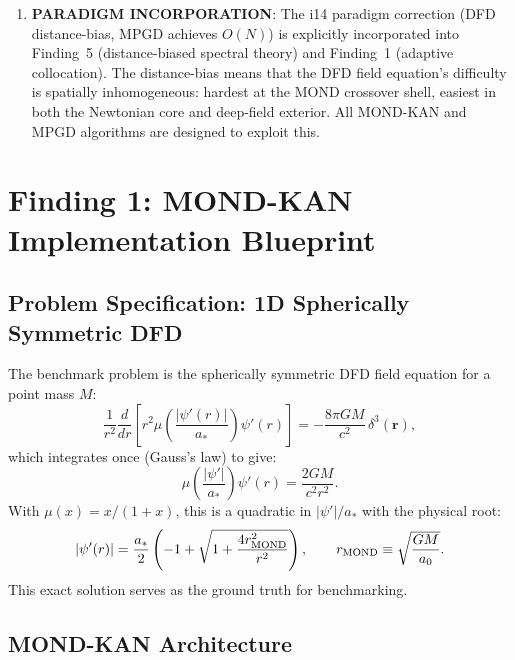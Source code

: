 \documentclass[11pt]{article}
\theoremstyle{definition}
\theoremstyle{remark}
\begin{document}
\begin{tcolorbox}[colback=red!5!white, colframe=red!60!black,
  title=\textbf{INCONSISTENCIES AND FLAGS}]
\begin{enumerate}[nosep]
\item \textbf{PARADIGM INCORPORATION}: The i14 paradigm correction
  (DFD distance-bias, MPGD achieves $O(N)$) is explicitly incorporated
  into Finding~5 (distance-biased spectral theory) and Finding~1
  (adaptive collocation). The distance-bias means that the DFD field
  equation's difficulty is spatially inhomogeneous: hardest at the MOND
  crossover shell, easiest in both the Newtonian core and deep-field
  exterior. All MOND-KAN and MPGD algorithms are designed to exploit this.
\end{enumerate}
\end{tcolorbox}

\newpage

\section{Finding 1: MOND-KAN Implementation Blueprint}
\label{sec:mond-kan-implementation}

\subsection{Problem Specification: 1D Spherically Symmetric DFD}
\label{sec:1d-problem}

The benchmark problem is the spherically symmetric DFD field equation for
a point mass $M$:
\begin{equation}
  \frac{1}{r^2}\frac{d}{dr}\!\left[r^2 \mu\!\left(\frac{|\psi'(r)|}{a_*}\right)
  \psi'(r)\right] = -\frac{8\pi G M}{c^2}\,\delta^3(\mathbf{r}),
  \label{eq:1d-dfd}
\end{equation}
which integrates once (Gauss's law) to give:
\begin{equation}
  \mu\!\left(\frac{|\psi'|}{a_*}\right) \psi'(r) = \frac{2GM}{c^2 r^2}.
  \label{eq:1d-gauss}
\end{equation}
With $\mu(x) = x/(1+x)$, this is a quadratic in $|\psi'|/a_*$ with
the physical root:
\begin{equation}
  |\psi'(r)| = \frac{a_*}{2}\left(-1 + \sqrt{1 + \frac{4r_{\rm MOND}^2}{r^2}}\right),
  \qquad r_{\rm MOND} \equiv \sqrt{\frac{GM}{a_0}}.
  \label{eq:exact-solution}
\end{equation}
This exact solution serves as the ground truth for benchmarking.

\subsection{MOND-KAN Architecture}
\label{sec:architecture}
\end{document}
